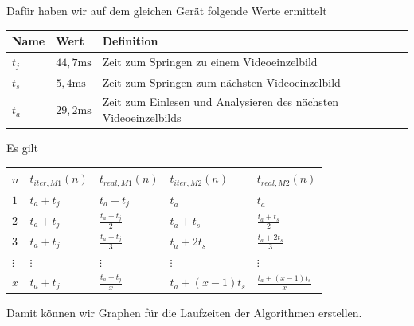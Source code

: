 \documentclass[11pt,a4paper]{article}
\newcommand{\ms}{\mathrm{ms}}
\begin{document}
Dafür haben wir auf dem gleichen Gerät folgende Werte ermittelt
\begin{center}
    \begin{tabular}{p{.07\linewidth}|p{.07\linewidth}|p{.5\linewidth}}
        Name & Wert & Definition \\ \hline
        $t_j$ & $44,7 \ms$ & Zeit zum Springen zu einem Videoeinzelbild \\ \hline
        $t_s$ & $5,4 \ms$ & Zeit zum Springen zum nächsten Videoeinzelbild \\ \hline
        $t_a$ & $29,2 \ms$ & Zeit zum Einlesen und Analysieren des nächsten Videoeinzelbilds
    \end{tabular}
\end{center}
Es gilt
\begin{center}
    \begin{tabular}{p{.07\linewidth}|p{.15\linewidth}|p{.15\linewidth}|p{.15\linewidth}|p{.15\linewidth}}
        $n$ & $t_{iter, M1}(n)$ & $t_{real, M1}(n)$ & $t_{iter, M2}(n)$ & $t_{real, M2}(n)$\\ \hline
        $1$ & $t_a + t_j$ & $t_a + t_j$ & $t_a$ & $t_a$\\
        $2$ & $t_a + t_j$ & $\frac{t_a + t_j}{2}$ & $t_a + t_s$ & $\frac{t_a+t_s}{2}$\\
        $3$ & $t_a + t_j$ & $\frac{t_a + t_j}{3}$ & $t_a + 2t_s$ & $\frac{t_a+2t_s}{3}$\\
        $\vdots$ & $\vdots$ & $\vdots$ & $\vdots$ & $\vdots$\\
        $x$ & $t_a + t_j$ & $\frac{t_a + t_j}{x}$ & $t_a + (x-1)t_s$ & $\frac{t_a+(x-1)t_s}{x}$
    \end{tabular}
\end{center}
Damit können wir Graphen für die Laufzeiten der Algorithmen erstellen.
\end{document}
